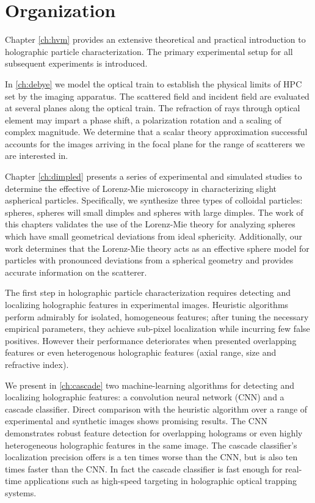 \section{Organization}

Chapter \ref{ch:hvm} provides an extensive theoretical and practical
introduction to holographic particle characterization. The primary
experimental setup for all subsequent experiments is introduced.

In \autoref{ch:debye} we model the optical train to establish the
physical limits of HPC set by the imaging apparatus. The scattered
field and incident field are evaluated at several planes along the
optical train. The refraction of rays through optical element
may impart a phase shift, a polarization rotation and a scaling
of complex magnitude. We determine that a scalar theory
approximation successful accounts for the images arriving in the
focal plane for the range of scatterers we are interested in.

Chapter \ref{ch:dimpled} presents a series of experimental and
simulated studies to determine the effective of Lorenz-Mie
microscopy in characterizing slight aspherical particles.
Specifically, we synthesize three types of colloidal particles:
spheres, spheres will small dimples and spheres with large dimples.
The work of this chapters validates the use of the Lorenz-Mie theory
for analyzing spheres which have small geometrical deviations from
ideal sphericity. Additionally, our work determines that the Lorenz-Mie
theory acts as an effective sphere model for particles with
pronounced deviations from a spherical geometry and provides
accurate information on the scatterer.

The first step in holographic particle characterization
requires detecting and localizing holographic features in experimental
images. Heuristic algorithms perform admirably for isolated, homogeneous
features; after tuning the necessary empirical parameters, they achieve
sub-pixel localization while incurring few false positives. However their
performance deteriorates when presented overlapping features or even
heterogenous holographic features (axial range, size and refractive index).

We present in \autoref{ch:cascade} two machine-learning algorithms for
detecting and localizing holographic features: a convolution
neural network (CNN) and a cascade classifier. Direct comparison with the
heuristic algorithm over a range of experimental and synthetic images
shows promising results. The CNN demonstrates robust feature detection
for overlapping holograms or even highly heterogeneous holographic features
in the same image. The cascade classifier's localization precision
offers is a ten times worse than the CNN, but is also ten times faster than
the CNN. In fact the cascade classifier is fast enough for real-time
applications such as high-speed targeting in holographic optical
trapping systems.

